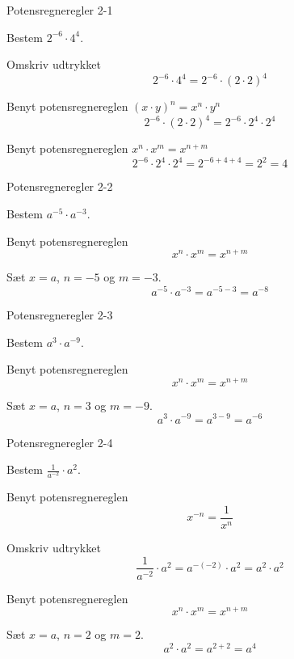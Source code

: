 \documentclass{article}
\begin{document}
\tableofcontents
\newpage

\begin{exercise}{Potensregneregler 2-1}

Bestem $2^{-6} \cdot 4^4$.


\hint 
Omskriv udtrykket
\[
2^{-6} \cdot 4^4 = 2^{-6} \cdot (2 \cdot 2)^4
\]

\hint

Benyt potensregnereglen $(x \cdot y)^n = x^n \cdot y^n$
\[
2^{-6} \cdot (2 \cdot 2)^4 = 2^{-6} \cdot 2^4 \cdot 2^4
\]

\hint
Benyt potensregnereglen $ x^n \cdot x^m  = x^{n+m}$
\[
2^{-6} \cdot 2^4 \cdot 2^4 = 2^{-6+4+4} = 2^2  = 4
\]

\end{exercise}

\newpage

\begin{exercise}{Potensregneregler 2-2}
	
	Bestem $a^{-5} \cdot a^{-3}$.
	
	
	\hint
	
	Benyt potensregnereglen 
	\[
	x^n \cdot x^m  = x^{n+m}
	\] 
	\hint 
	
	Sæt $x=a$, $n=-5$ og $m=-3$.
	\[
	a^{-5} \cdot a^{-3} = a^{-5-3} = a^{-8}
	\]
	
\end{exercise}

\newpage

\begin{exercise}{Potensregneregler 2-3}
	
	Bestem $a^{3} \cdot a^{-9}$.
	
	
	\hint
	Benyt potensregnereglen 
	\[
	x^n \cdot x^m  = x^{n+m}
	\] 
	
	\hint 
	
	Sæt $x=a$, $n=3$ og $m=-9$.
	\[
	a^{3} \cdot a^{-9} = a^{3-9} = a^{-6}
	\]
	
\end{exercise}

\newpage

\begin{exercise}{Potensregneregler 2-4}
	
	Bestem $\frac{1}{a^{-2}} \cdot a^{2}$.
	
	
	\hint
	Benyt potensregnereglen 
	\[
	 x^{-n} = \frac{1}{x^{n}} 
	\]
	
	\hint 
	
	Omskriv udtrykket
	\[
	\frac{1}{a^{-2}} \cdot a^{2} = a^{-(-2)} \cdot a^2 	= a^2 \cdot a^2
	\]
	
	\hint
	Benyt potensregnereglen 
	\[
	x^n \cdot x^m  = x^{n+m}
	\]
	
	\hint 
	
	Sæt $x=a$, $n=2$ og $m=2$.
	\[
	a^{2} \cdot a^{2} = a^{2+2} = a^{4}
	\]
	
\end{exercise}
\end{document}
